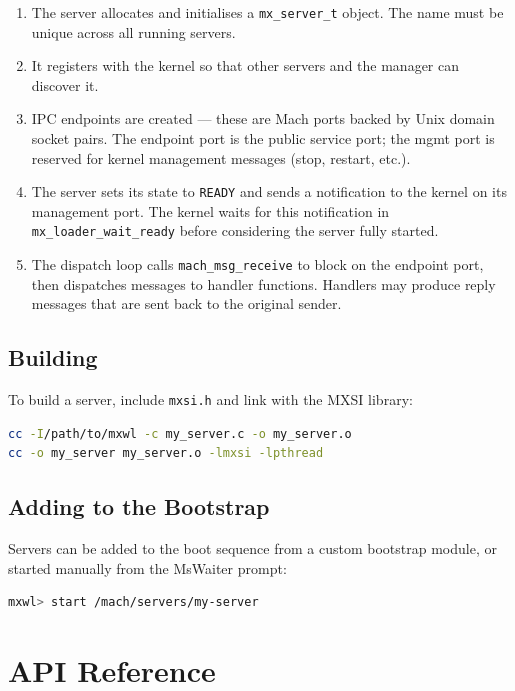 \documentclass[a4paper,11pt]{article}
\begin{document}
\begin{enumerate}
  \item The server allocates and initialises a
    \texttt{mx\_server\_t} object. The name must be unique across
    all running servers.
  \item It registers with the kernel so that other servers and the
    manager can discover it.
  \item IPC endpoints are created --- these are Mach ports backed by
    Unix domain socket pairs. The endpoint port is the public
    service port; the mgmt port is reserved for kernel management
    messages (stop, restart, etc.).
  \item The server sets its state to \texttt{READY} and sends a
    notification to the kernel on its management port. The kernel
    waits for this notification in \texttt{mx\_loader\_wait\_ready}
    before considering the server fully started.
  \item The dispatch loop calls \texttt{mach\_msg\_receive} to block
    on the endpoint port, then dispatches messages to handler
    functions. Handlers may produce reply messages that are sent
    back to the original sender.
\end{enumerate}

\subsection{Building}

To build a server, include \texttt{mxsi.h} and link with the MXSI
library:

\begin{lstlisting}[language=bash]
cc -I/path/to/mxwl -c my_server.c -o my_server.o
cc -o my_server my_server.o -lmxsi -lpthread
\end{lstlisting}

\subsection{Adding to the Bootstrap}

Servers can be added to the boot sequence from a custom bootstrap
module, or started manually from the MsWaiter prompt:

\begin{lstlisting}[language=bash]
mxwl> start /mach/servers/my-server
\end{lstlisting}

\section{API Reference}
\end{document}
